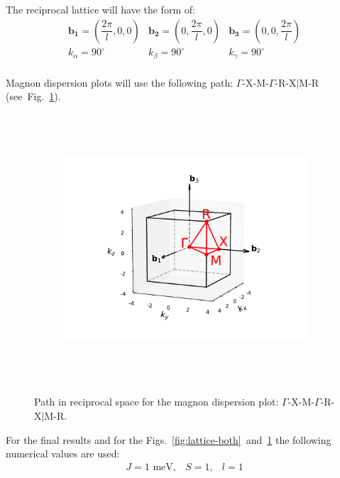\documentclass[a4paper,12pt]{article}
\begin{document}
The reciprocal lattice will have the form of:
\begin{equation}
    \begin{matrix}
        \mathbf{b_1} = (\dfrac{2\pi}{l}, 0, 0) & \mathbf{b_2} = (0,\dfrac{2\pi}{l}, 0) & \mathbf{b_3} = (0, 0, \dfrac{2\pi}{l}) \\
        k_{\alpha} = 90^{\circ} & k_{\beta} = 90^{\circ} & k_{\gamma} = 90^{\circ} \\
    \end{matrix}
\end{equation}

Magnon dispersion plots will use the following path: $\Gamma$-X-M-$\Gamma$-R-X$\vert$M-R (see~Fig.~\ref{fig:path}).

\begin{figure}[H]
	\centering
	\begin{subfigure}[b]{0.8\textwidth}
		\centering
		\includegraphics[height=10cm]{path.pdf}
	\end{subfigure}
	\hfill
	\caption{Path in reciprocal space for the magnon dispersion plot: $\Gamma$-X-M-$\Gamma$-R-X$\vert$M-R.}
	\label{fig:path}
\end{figure}


For the final results and for the Figs.~\ref{fig:lattice-both}~and~\ref{fig:path} the following numerical values are used:
\begin{equation}
    \begin{matrix}
        J = 1 \text{ meV}, & S = 1, & l = 1
    \end{matrix}
\end{equation}
\end{document}

